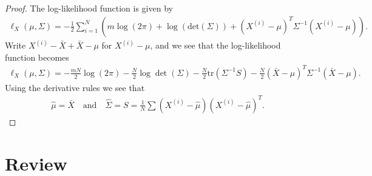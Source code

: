 \documentclass[a4paper, 11pt]{article}
\begin{document}
\begin{proof}
  The log-likelihood function is given by 
  \begin{align*}
    \ell_{X}( \mu, \Sigma) = -\frac{1}{2} \sum_{i=1}^N \left( m\log(2\pi) +  \log(\mathrm{det}(\Sigma)) + (X^{(i)} - \mu)^T \Sigma^{-1} (X^{(i)} - \mu) \right).
  \end{align*}
  Write \( X^{(i)} - \bar X + \bar X - \mu \) for \( X^{(i)} - \mu \), and we see that the log-likelihood function becomes 
  \begin{align*}
    \ell_{X}(\mu, \Sigma) = -\frac{mN}{2}\log(2 \pi) - \frac{N}{2} \log\det(\Sigma) -\frac{N}{2} \mathrm{tr}(\Sigma^{-1}S) - \frac{N}{2} (\bar X - \mu)^T \Sigma^{-1} (\bar X - \mu).
  \end{align*}
  Using the derivative rules we see that 
  \begin{align*}
    \hat \mu = \bar X \quad \text{and} \quad \hat \Sigma = S = \frac{1}{N} \sum (X^{(i)} - \hat \mu)(X^{(i)} - \hat \mu)^T.
  \end{align*}
\end{proof}


\clearpage


\clearpage


\clearpage



\clearpage
\section{Review}
\end{document}
